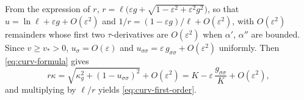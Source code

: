 From the expression of \(r\), \(r = \ell\bigl(\varepsilon g + \sqrt{1-\varepsilon^2+\varepsilon^2g^2}\bigr)\), so that \(u = \ln\ell + \varepsilon g + O(\varepsilon^2)\) and \(1/r = (1-\varepsilon g)/\ell + O(\varepsilon^2)\), with \(O(\varepsilon^2)\) remainders whose first two \(\tau\)-derivatives are \(O(\varepsilon^2)\) when \(\alpha'\), \(\alpha''\) are bounded.
Since \(v\ge v_*>0\), \(u_\sigma = O(\varepsilon)\) and \(u_{\sigma\sigma} = \varepsilon\,g_{\sigma\sigma} + O(\varepsilon^2)\) uniformly.
Then \eqref{eq:curv-formula} gives
\begin{equation}
    r\kappa = \sqrt{\kappa_g^2 + (1-u_{\sigma\sigma})^2} + O(\varepsilon^2) = K - \varepsilon\,\frac{g_{\sigma\sigma}}{K} + O(\varepsilon^2),
\end{equation}
and multiplying by \(\ell/r\) yields \eqref{eq:curv-first-order}.
